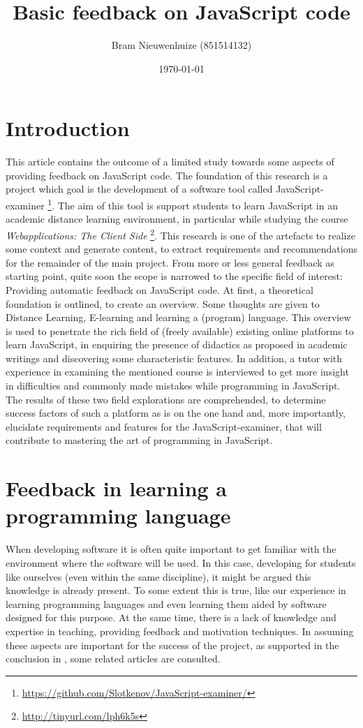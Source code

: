 \documentclass{article}
\begin{document}
 

\title{Basic feedback on JavaScript code} \author{Bram Nieuwenhuize (851514132)} 
\date{\today} \maketitle 

\section{Introduction} This article contains the outcome of a limited study 
towards 
some aspects of providing feedback on JavaScript code. The foundation of this 
research is a project which goal is the development of a software tool called 
JavaScript-examiner
\footnote{\url{https://github.com/Slotkenov/JavaScript-examiner/}}.
The aim of this tool is support students to learn 
JavaScript in an academic distance learning environment, in particular
while studying the course {\em Webapplications: The Client Side}
\footnote{\url{http://tinyurl.com/lph6k5s}}. This research is one of 
the artefacts to realize some context and generate content, to extract 
requirements and recommendations for the remainder of the main project. \newline 
From more or less general feedback as starting point, quite soon the scope is 
narrowed to the specific field of interest: Providing automatic feedback on 
JavaScript code. At first, a theoretical foundation is outlined, to create an 
overview. Some thoughts are given to Distance Learning, E-learning and 
learning a (program) language.
This overview is used to penetrate the rich field of (freely 
available) existing online platforms to learn JavaScript, in enquiring the
presence of didactics as proposed in academic writings and discovering some 
characteristic features. In addition, a tutor with experience in examining
the mentioned course is 
interviewed to get more insight in difficulties and commonly made mistakes while 
programming in JavaScript. The results of these two field explorations are 
comprehended, to determine success factors of such a platform as is on the one 
hand and, more importantly, elucidate requirements and features for the 
JavaScript-examiner, that will contribute to mastering the art of programming in 
JavaScript. 

\section{Feedback in learning a programming language}
When developing software it is often quite important to get familiar with the 
environment where the software will be used. In this case, developing for
students like ourselves (even within the same discipline), it might be argued
this knowledge is already present. To some extent this is true, like our
experience in learning programming languages and even learning them aided by 
software designed for this purpose. At the same time, there is a lack of
knowledge and expertise in teaching, providing feedback and 
motivation techniques. In assuming these aspects are important for the success
of the project, as supported in the conclusion in
\citep{al2009investigating}
 , some related articles are consulted.
\end{document}

